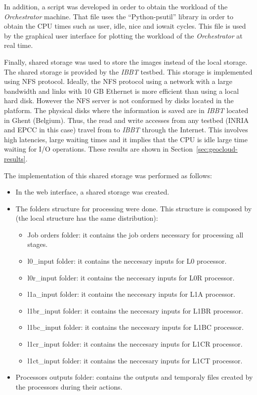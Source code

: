 In addition, a script was developed in order to obtain the workload of the
\emph{Orchestrator} machine. That file uses the ``Python-psutil'' library in order to
obtain the CPU times such as user, idle, nice and iowait cycles. This file is
used by the graphical user interface for plotting the workload of the \emph{Orchestrator} at
real time.

Finally,  shared storage was used to store the images instead of
the local storage. The shared storage is provided by the \emph{IBBT} testbed. This storage is implemented using \ac{NFS} protocol. Ideally, the \ac{NFS}
protocol using a network with a large bandwidth and links with 10 GB Ethernet is
more efficient than using a local hard disk. However the \ac{NFS}
server is not conformed by disks located in the \bonfire platform. The physical disks
where the information is saved are in \emph{IBBT} located in Ghent (Belgium). Thus, the
read and write accesses from any \bonfire testbed (INRIA and EPCC in this case)
travel from \bonfire to \emph{IBBT} through the Internet. This involves high
latencies, large waiting times and it implies that the CPU is idle large time
waiting for I/O operations. These results are shown in Section~\ref{sec:geocloud-results}.

The implementation of this shared storage was performed as follows:
\begin{itemize}
\item In the \bonfire web interface, a shared storage was created. 
\item The folders structure for processing were done. This structure is composed
  by (the local structure has the same distribution): 
\begin{itemize}
\item Job orders folder: it contains the job orders necessary for processing all
  stages.
\item l0\_input folder: it contains the neccesary inputs for L0 processor. 
\item l0r\_input folder: it contains the neccesary inputs for L0R processor. 
\item l1a\_input folder: it contains the neccesary inputs for L1A processor. 
\item l1br\_input folder: it contains the neccesary inputs for L1BR processor. 
\item l1bc\_input folder: it contains the neccesary inputs for L1BC processor. 
\item l1cr\_input folder: it contains the neccesary inputs for L1CR processor. 
\item l1ct\_input folder: it contains the neccesary inputs for L1CT processor. 
\end{itemize}
\item Processors outputs folder: contains the outputs and temporaly files
  created by the processors during their actions.
\end{itemize}

